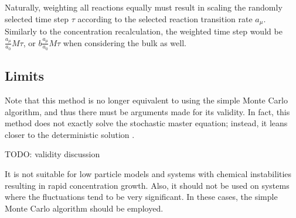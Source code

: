 Naturally, weighting all reactions equally must result in scaling the randomly selected time step $\tau$ according to the selected reaction transition rate $a_\mu$. Similarly to the concentration recalculation, the weighted time step would be $\frac{a_\mu}{a_0}M\tau$, or $b\frac{a_\mu}{a_0}M\tau$ when considering the bulk as well.

\subsection{Limits}

Note that this method is no longer equivalent to using the simple Monte Carlo algorithm, and thus there must be arguments made for its validity. In fact, this method does not exactly solve the stochastic master equation; instead, it leans closer to the deterministic solution \cite{tiago20}.

TODO: validity discussion

It is not suitable for low particle models and systems with chemical instabilities resulting in rapid concentration growth. Also, it should not be used on systems where the fluctuations tend to be very significant. In these cases, the simple Monte Carlo algorithm should be employed. \cite{tiago20}